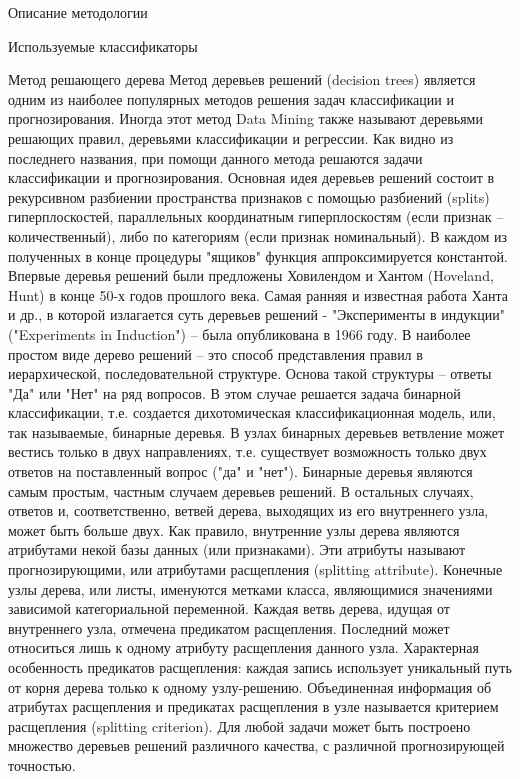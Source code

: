 \begin{section}{Описание методологии}
\begin{subsection}{Используемые классификаторы}
    \begin{subsubsection}{Метод решающего дерева}
      Метод деревьев решений (decision trees) является одним из наиболее популярных методов решения задач классификации и прогнозирования. Иногда этот метод Data Mining также называют деревьями решающих правил, деревьями классификации и регрессии.
Как видно из последнего названия, при помощи данного метода решаются задачи классификации и прогнозирования.
Основная идея деревьев решений состоит в рекурсивном разбиении пространства признаков с помощью разбиений (splits) гиперплоскостей, параллельных координатным гиперплоскостям (если признак – количественный), либо по категориям (если признак номинальный). В каждом из полученных в конце процедуры "ящиков"  функция аппроксимируется константой.
Впервые деревья решений были предложены Ховилендом и Хантом (Hoveland, Hunt) в конце 50-х годов прошлого века. Самая ранняя и известная работа Ханта и др., в которой излагается суть деревьев решений - "Эксперименты в индукции" ("Experiments in Induction") – была опубликована в 1966 году.
В наиболее простом виде дерево решений – это способ представления правил в иерархической, последовательной структуре. Основа такой структуры – ответы "Да" или "Нет" на ряд вопросов. В этом случае решается задача бинарной классификации, т.е. создается дихотомическая классификационная модель, или, так называемые, бинарные деревья.
В узлах бинарных деревьев ветвление может вестись только в двух направлениях, т.е. существует возможность только двух ответов на поставленный вопрос ("да" и "нет"). Бинарные деревья являются самым простым, частным случаем деревьев решений. В остальных случаях, ответов и, соответственно, ветвей дерева, выходящих из его внутреннего узла, может быть больше двух.
Как правило, внутренние узлы дерева являются атрибутами некой базы данных (или признаками). Эти атрибуты называют прогнозирующими, или атрибутами расщепления (splitting attribute). Конечные узлы дерева, или листы, именуются метками класса, являющимися значениями зависимой категориальной переменной.
Каждая ветвь дерева, идущая от внутреннего узла, отмечена предикатом расщепления. Последний может относиться лишь к одному атрибуту расщепления данного узла. Характерная особенность предикатов расщепления: каждая запись использует уникальный путь от корня дерева только к одному узлу-решению. Объединенная информация об атрибутах расщепления и предикатах расщепления в узле называется критерием расщепления (splitting criterion).
Для любой задачи может быть построено множество деревьев решений различного качества, с различной прогнозирующей точностью.

\end{subsubsection}
\end{subsection}
\end{section}
